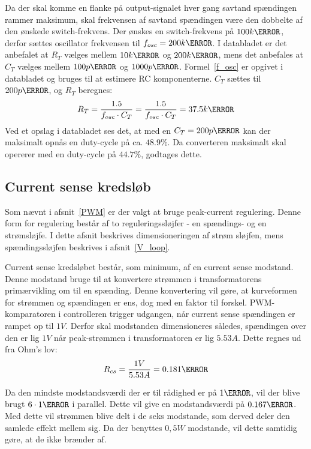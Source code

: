 Da der skal komme en flanke på output-signalet hver gang savtand spændingen rammer maksimum, skal frekvensen af savtand spændingen være den dobbelte af den ønskede switch-frekvens. Der ønskes en switch-frekvens på $100k\hertz$, derfor sættes oscillator frekvensen til $f_{osc}=200k\hertz$. I databladet er det anbefalet at $R_T$ vælges mellem $10k\ohm$ og $200k\ohm$, mens det anbefales at $C_T$ vælges mellem $100p\farad$ og $1000p\farad$. Formel~\ref{f_osc} er opgivet i databladet og bruges til at estimere RC komponenterne. $C_T$ sættes til $200p\farad$, og $R_T$ beregnes:
\begin{equation} \label{f_osc}
R_{T} = \frac{1.5}{f_{osc} \cdot C_T} = \frac{1.5}{f_{osc} \cdot C_T} = 37.5k\ohm
\end{equation}
Ved et opslag i databladet ses det, at med en $C_T=200p\farad$ kan der maksimalt opnås en duty-cycle på ca. $48.9\percent$. Da converteren maksimalt skal opererer med en duty-cycle på $44.7\percent$, godtages dette.

\subsection{Current sense kredsløb} \label{CS_loop}
Som nævnt i afsnit~\ref{PWM} er der valgt at bruge peak-current regulering. Denne form for regulering består af to reguleringssløjfer - en spændings- og en strømsløjfe. I dette afsnit beskrives dimensioneringen af strøm sløjfen, mens spændingssløjfen beskrives i afsnit~\ref{V_loop}.

Current sense kredsløbet består, som minimum, af en current sense modstand. Denne modstand bruge til at konvertere strømmen i transformatorens primærvikling om til en spænding. Denne konvertering vil gøre, at kurveformen for strømmen og spændingen er ens, dog med en faktor til forskel. PWM-komparatoren i controlleren trigger udgangen, når current sense spændingen er rampet op til $1V$. Derfor skal modstanden dimensioneres således, spændingen over den er lig $1V$ når peak-strømmen i transformatoren er lig $5.53A$. Dette regnes ud fra Ohm's lov:
\begin{equation} \label{R_cs}
R_{cs} = \frac{1V}{5.53A} = 0.181\ohm
\end{equation}

Da den mindste modstandsværdi der er til rådighed er på $1\ohm$, vil der blive brugt $6\cdot 1\ohm$ i parallel. Dette vil give en modstandsværdi på $0.167\ohm$. Med dette vil strømmen blive delt i de seks modstande, som derved deler den samlede effekt mellem sig. Da der benyttes $0,5W$ modstande, vil dette samtidig gøre, at de ikke brænder af. 

